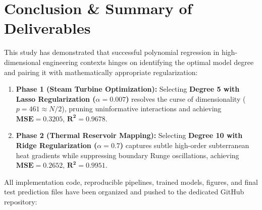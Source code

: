 \documentclass[10pt,twocolumn]{article}
\begin{document}
\section{Conclusion \& Summary of Deliverables}
This study has demonstrated that successful polynomial regression in high-dimensional engineering contexts hinges on identifying the optimal model degree and pairing it with mathematically appropriate regularization:
\begin{enumerate}\setlength{\itemsep}{1pt}
    \item \textbf{Phase 1 (Steam Turbine Optimization):} Selecting \textbf{Degree 5 with Lasso Regularization ($\alpha = 0.007$)} resolves the curse of dimensionality ($p=461 \approx N/2$), pruning uninformative interactions and achieving $\mathbf{\text{MSE} = 0.3205}$, $\mathbf{R^2 = 0.9678}$.
    \item \textbf{Phase 2 (Thermal Reservoir Mapping):} Selecting \textbf{Degree 10 with Ridge Regularization ($\alpha = 0.7$)} captures subtle high-order subterranean heat gradients while suppressing boundary Runge oscillations, achieving $\mathbf{\text{MSE} = 0.2652}$, $\mathbf{R^2 = 0.9951}$.
\end{enumerate}

All implementation code, reproducible pipelines, trained models, figures, and final test prediction files have been organized and pushed to the dedicated GitHub repository:
\begin{center}
\end{center}
\end{document}
